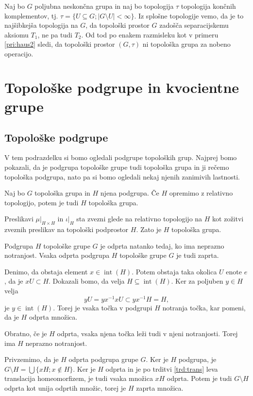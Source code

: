 \documentclass[mat1]{fmfdelo}
\DeclareMathOperator{\interior}{int}
\begin{document}
\begin{primer}
Naj bo $G$ poljubna neskončna grupa in naj bo topologija $\tau$ topologija končnih komplementov, tj. $\tau = \lbrace U \subseteq G ; |G\setminus U| < \infty \rbrace$.
Iz splošne topologije vemo, da je to najšibkejša topologija na $G$, da topološki prostor $G$ zadošča separacijskemu aksiomu $T_1$, ne pa tudi $T_2$. Od tod po enakem razmisleku kot v primeru \ref{pri:haus2} sledi, da topološki prostor $(G, \tau)$ ni topološka grupa za nobeno operacijo.
\end{primer}

\section{Topološke podgrupe in kvocientne grupe}
\subsection{Topološke podgrupe}
V tem podrazdelku si bomo ogledali podgrupe topoloških grup. Najprej bomo pokazali, da je podgrupa topološke grupe tudi topološka grupa in ji rečemo topološka podgrupa, nato pa si bomo ogledali nekaj njenih zanimivih lastnosti.
\begin{trditev}\label{trd:toppodgrupa}
Naj bo $G$ topološka grupa in $H$ njena podgrupa. Če $H$ opremimo z relativno topologijo, potem je tudi $H$ topološka grupa.
\end{trditev}

\begin{dokaz}
Preslikavi $\mu|_{H \times H}$ in $\iota|_H$ sta zvezni glede na relativno topologijo na $H$ kot zožitvi zveznih preslikav na topološki podprostor $H$. Zato je $H$ topološka grupa.
\end{dokaz}

\begin{trditev}\label{trd:odpzap}
Podgrupa $H$ topološke grupe $G$ je odprta natanko tedaj, ko ima ne\-praz\-no not\-ran\-jost. Vsaka odprta podgrupa $H$ topološke grupe $G$ je tudi zaprta.
\end{trditev}

\begin{dokaz}
Denimo, da obstaja element $x \in \interior(H)$. Potem obstaja taka okolica $U$ enote $e$, da je $xU \subset H$. Dokazali bomo, da velja $H \subseteq \interior(H)$. Ker za poljuben $y \in H$ velja \[yU = yx^{-1}xU \subset yx^{-1}H = H,\] je $y \in \interior(H)$. Torej je vsaka točka v podgrupi $H$ notranja točka, kar pomeni, da je $H$ odprta množica.

Obratno, če je $H$ odprta, vsaka njena točka leži tudi v njeni notranjosti. Torej ima $H$ neprazno notranjost.

Privzemimo, da je $H$ odprta podgrupa grupe $G$. Ker je $H$ podgrupa, je $G\setminus H = \bigcup \lbrace xH ; x \notin H \rbrace$. Ker je $H$ odprta in je po trditvi \ref{trd:trans} leva translacija homeomorfizem, je tudi vsaka množica $xH$ odprta. Potem je tudi $G \setminus H$ odprta kot unija odprtih množic, torej je $H$ zaprta množica.
\end{dokaz}
\end{document}

